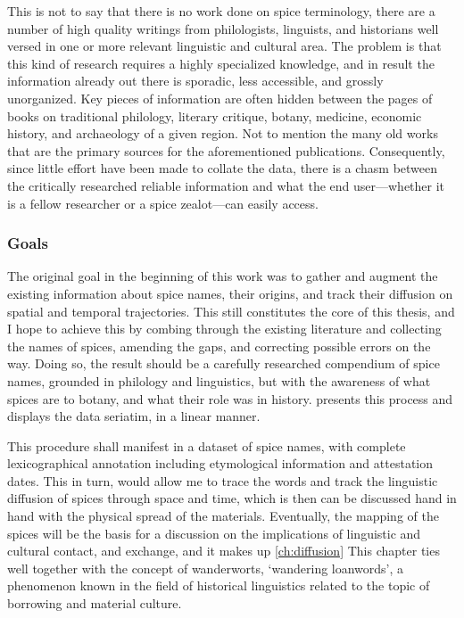 This is not to say that there is no work done on spice terminology, there are a number of high quality writings from philologists, linguists, and historians well versed in one or more relevant linguistic and cultural area. The problem is that this kind of research requires a highly specialized knowledge, and in result the information already out there is sporadic, less accessible, and grossly unorganized. Key pieces of information are often hidden between the pages of books on traditional philology, literary critique, botany, medicine, economic history, and archaeology of a given region. Not to mention the many old works that are the primary sources for the aforementioned publications. Consequently, since little effort have been made to collate the data, there is a chasm between the critically researched reliable information and what the end user---whether it is a fellow researcher or a spice zealot---can easily access.

\subsubsection{Goals}

The original goal in the beginning of this work was to gather and augment the existing information about spice names, their origins, and track their diffusion on spatial and temporal trajectories. This still constitutes the core of this thesis, and I hope to achieve this by combing through the existing literature and collecting the names of spices, amending the gaps, and correcting possible errors on the way. Doing so, the result should be a carefully researched compendium of spice names, grounded in philology and linguistics, but with the awareness of what spices are to botany, and what their role was in history.  presents this process and displays the data seriatim, in a linear manner. 

This procedure shall manifest in a dataset of spice names, with complete lexicographical annotation including etymological information and attestation dates. This in turn, would allow me to trace the words and track the linguistic diffusion of spices through space and time, which is then can be discussed hand in hand with the physical spread of the materials. Eventually, the mapping of the spices will be the basis for a discussion on the implications of linguistic and cultural contact, and exchange, and it makes up \cref{ch:diffusion}
This chapter ties well together with the concept of \glspl{wanderwort}, `wandering loanwords', a phenomenon known in the field of historical linguistics related to the topic of borrowing and material culture. 

